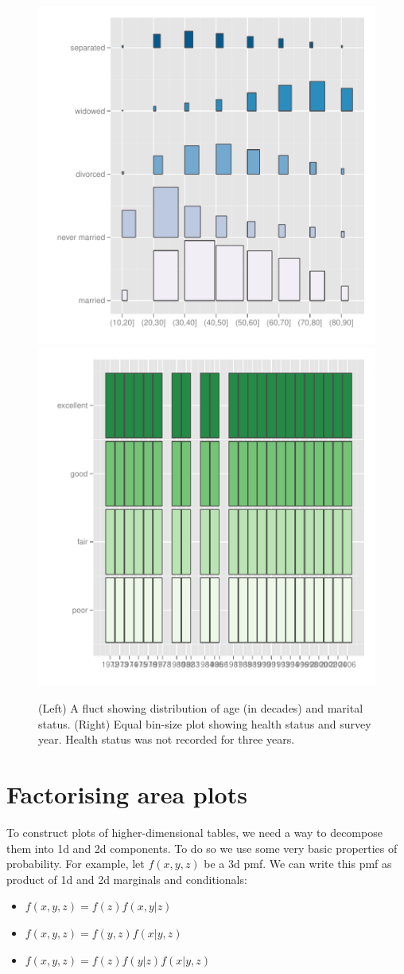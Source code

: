 \documentclass[journal]{vgtc}
\begin{document}
\begin{figure}[htbp]
  \centering
    \includegraphics[width=0.5\linewidth]{part-fluct}%
    \includegraphics[width=0.5\linewidth]{part-fluct-cond}
  \caption{(Left) A fluct showing distribution of age (in decades) and marital status. (Right) Equal bin-size plot showing health status and survey year. Health status was not recorded for three years.}
  \label{fig:fluct}
\end{figure}

\section{Factorising area plots}
\label{sec:combination}

To construct plots of higher-dimensional tables, we need a way to decompose them into 1d and 2d components. To do so we use some very basic properties of probability. For example, let $f(x, y, z)$ be a 3d pmf. We can write this pmf as product of 1d and 2d marginals and conditionals:

\begin{itemize}
  \item $f(x, y, z) = f(z) f(x, y | z)$
  \item $f(x, y, z) = f(y, z) f(x | y, z) $
  \item $f(x, y, z) = f(z) f(y | z) f(x | y, z)$
\end{itemize}
\end{document}
